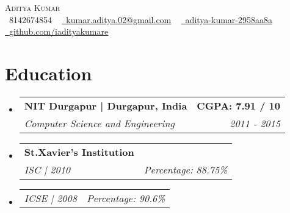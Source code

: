 \documentclass[letterpaper,11pt]{article}
\makeatletter
\newcommand{\resumeSubheading}[4]{
  \vspace{-2pt}\item
    \begin{tabular*}{1.0\textwidth}[t]{l@{\extracolsep{\fill}}r}
      \textbf{#1} & \textbf{\small #2} \\
      \textit{\small#3} & \textit{\small #4} \\
    \end{tabular*}\vspace{-7pt}
}
\newcommand{\resumeSubSubheading}[2]{
    \item
	\begin{tabular*}{1.0\textwidth}{l@{\extracolsep{\fill}}r}
      \textit{\small#1} & \textit{\small #2} \\
    \end{tabular*}\vspace{-7pt}
}
\newcommand{\resumeSubHeadingListStart}{\begin{itemize}[leftmargin=0.0in, label={}]}
\newcommand{\resumeSubHeadingListEnd}{\end{itemize}}
\makeatother
\begin{document}

\begin{center}
    {\Huge \scshape Aditya Kumar}  \\ \vspace{1pt}
    \small \raisebox{-0.1\height}\faPhone\ 8142674854 ~ \href{mailto:x@gmail.com}{\raisebox{-0.2\height}\faEnvelope\  \underline{kumar.aditya.02@gmail.com}} ~ 
    \href{https://www.linkedin.com/in/aditya-kumar-2958aa8a/}{\raisebox{-0.2\height}\faLinkedin\ \underline{aditya-kumar-2958aa8a}}  ~
    \href{https://github.com/iadityakumar}{\raisebox{-0.2\height}\faGithub\ \underline{github.com/iadityakumare}}
    \vspace{-8pt}
\end{center}

\section{Education}
  \resumeSubHeadingListStart
    \resumeSubheading
      {NIT Durgapur | Durgapur, India}{CGPA: 7.91 / 10}
      {Computer Science and Engineering}{ 2011 - 2015}
     \resumeSubheading
     {St.Xavier's Institution}{}
     {ISC | 2010}{Percentage: 88.75\%}
     \resumeSubSubheading
     {ICSE | 2008}{ \indent Percentage: 90.6\%}
     
  \resumeSubHeadingListEnd
\end{document}
